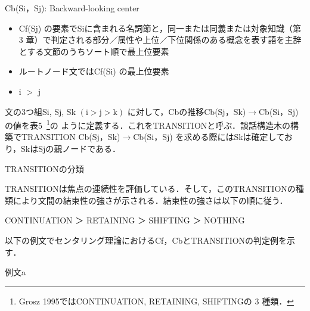 \documentclass[japanese]{jnlp_1.4}
\begin{document}
Cb(Si，Sj): Backward-looking center

\begin{itemize}
\item Cf(Sj) の要素でSiに含まれる名詞節と，同一または同義または対象知識（第 3 章）で判定される部分／属性や上位／下位関係のある概念を表す語を主辞とする文節のうちソート順で最上位要素
\item ルートノード文ではCf(Si) の最上位要素
\item i $>$ j
\end{itemize}
\vspace{1\baselineskip}

文の3つ組Si, Sj, Sk $(\mathrm{i}>\mathrm{j}>\mathrm{k})$ に対して，Cbの推移Cb(Sj，Sk)$\to$Cb(Si，Sj)の値を表5\ \footnote{Grosz 1995ではCONTINUATION, RETAINING, SHIFTINGの 3 種類．}の
\linebreak
ように定義する．これをTRANSITIONと呼ぶ．談話構造木の構築でTRANSITION Cb(Sj，Sk)$\to $Cb(Si，Sj) 
を求める際にはSkは確定しており，SkはSjの親ノードである．

\begin{table}[t]
\caption{TRANSITIONの分類}

\end{table}

TRANSITIONは焦点の連続性を評価している．そして，このTRANSITIONの種類により文間の結束性の強さが示される．結束性の強さは以下の順に従う．
\vspace{1\baselineskip}

CONTINUATION ＞ RETAINING ＞ SHIFTING ＞ NOTHING
\vspace{1\baselineskip}

以下の例文でセンタリング理論におけるCf，CbとTRANSITIONの判定例を示す．
\vspace{1\baselineskip}

例文a

\vspace{0.5\baselineskip}
\vspace{1\baselineskip}
\end{document}
